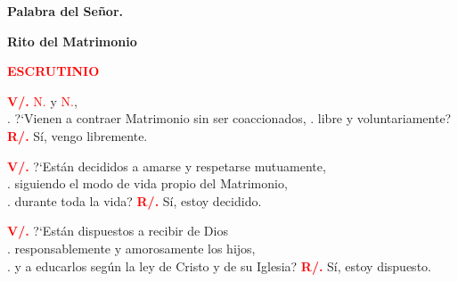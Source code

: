\documentclass[12pt, letterpaper, spanish]{report}
\begin{document}
{\bfseries Palabra del Se\~nor.} \newline

\newpage

\begin{center} 
\Huge {\bfseries Rito del Matrimonio}
\end{center}

\vspace{1cm}

\Large {\bfseries \textcolor{red}{ESCRUTINIO}} \newline

\Large \hspace{-0.9cm} {\bfseries \textcolor{red}{V/.}} \hspace{0.5cm} \textcolor{red}{N.} y \textcolor{red}{N.}, \\
.\hspace{1.5cm} ?`Vienen a contraer Matrimonio sin ser coaccionados, \newline
.\hspace{1.5cm}  libre y voluntariamente? \newline
\Large {\bfseries \textcolor{red}{R/.}} \hspace{0.5cm} S\'i, vengo libremente. \newline

\Large \hspace{-0.9cm}  {\bfseries \textcolor{red}{V/.}} \hspace{0.5cm} ?`Est\'an decididos a amarse y respetarse mutuamente, \\
.\hspace{1.5cm} siguiendo el modo de vida propio del Matrimonio, \\
.\hspace{1.5cm} durante toda la vida? \newline
\Large {\bfseries \textcolor{red}{R/.}} \hspace{0.5cm} S\'i, estoy decidido. \newline

\Large \hspace{-0.9cm} {\bfseries \textcolor{red}{V/.}} \hspace{0.5cm} ?`Est\'an dispuestos a recibir de Dios \\
.\hspace{1.5cm} responsablemente y amorosamente los hijos, \\
.\hspace{1.5cm} y a educarlos seg\'un la ley de Cristo y de su Iglesia? \newline
\Large {\bfseries \textcolor{red}{R/.}} \hspace{0.5cm} S\'i, estoy dispuesto. \newline
\end{document}
